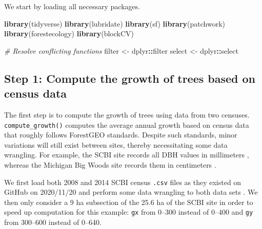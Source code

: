 \documentclass[12pt]{article}
\newenvironment{Shaded}{\begin{snugshade}}{\end{snugshade}}
\newcommand{\CommentTok}[1]{\textcolor[rgb]{0.56,0.35,0.01}{\textit{#1}}}
\newcommand{\KeywordTok}[1]{\textcolor[rgb]{0.13,0.29,0.53}{\textbf{#1}}}
\newcommand{\NormalTok}[1]{#1}
\newcommand{\OperatorTok}[1]{\textcolor[rgb]{0.81,0.36,0.00}{\textbf{#1}}}
\newcommand{\StringTok}[1]{\textcolor[rgb]{0.31,0.60,0.02}{#1}}
\begin{document}
We start by loading all necessary packages.

\begin{Shaded}
\begin{Highlighting}[]
\KeywordTok{library}\NormalTok{(tidyverse)}
\KeywordTok{library}\NormalTok{(lubridate)}
\KeywordTok{library}\NormalTok{(sf)}
\KeywordTok{library}\NormalTok{(patchwork)}
\KeywordTok{library}\NormalTok{(forestecology)}
\KeywordTok{library}\NormalTok{(blockCV)}

\CommentTok{# Resolve conflicting functions}
\NormalTok{filter <-}\StringTok{ }\NormalTok{dplyr}\OperatorTok{::}\NormalTok{filter}
\NormalTok{select <-}\StringTok{ }\NormalTok{dplyr}\OperatorTok{::}\NormalTok{select}
\end{Highlighting}
\end{Shaded}

\hypertarget{compute-growth}{%
\subsection{Step 1: Compute the growth of trees based on census
data}\label{compute-growth}}

The first step is to compute the growth of trees using data from two
censuses. \texttt{compute\_growth()} computes the average annual growth
based on census data that roughly follows ForestGEO standards. Despite
such standards, minor variations will still exist between sites, thereby
necessitating some data wrangling. For example, the SCBI site records
all DBH values in millimeters \citep{bourg_initial_2013}, whereas the
Michigan Big Woods site records them in centimeters
\citep{allen_michigan_2020}.

We first load both 2008 and 2014 SCBI census \texttt{.csv} files as they
existed on GitHub on 2020/11/20 and perform some data wrangling to both
data sets \citep{gonzalez-akre_scbi-forestgeoscbi-forestgeo-data_2020}.
We then only consider a 9 ha subsection of the 25.6 ha of the SCBI site
in order to speed up computation for this example: \texttt{gx} from
0--300 instead of 0--400 and \texttt{gy} from 300--600 instead of
0--640.
\end{document}
